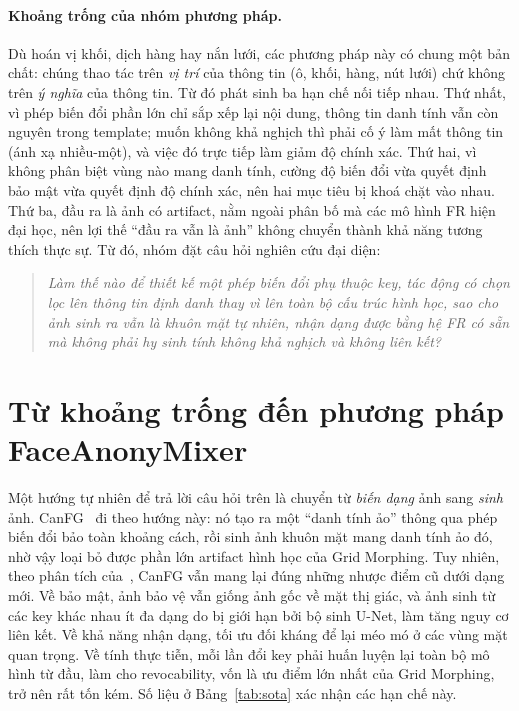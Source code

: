 \documentclass[12pt,a4paper]{article}
\begin{document}
\paragraph{Khoảng trống của nhóm phương pháp.} Dù hoán vị khối, dịch hàng hay nắn lưới, các phương pháp này có chung một bản chất: chúng thao tác trên \emph{vị trí} của thông tin (ô, khối, hàng, nút lưới) chứ không trên \emph{ý nghĩa} của thông tin. Từ đó phát sinh ba hạn chế nối tiếp nhau. Thứ nhất, vì phép biến đổi phần lớn chỉ sắp xếp lại nội dung, thông tin danh tính vẫn còn nguyên trong template; muốn không khả nghịch thì phải cố ý làm mất thông tin (ánh xạ nhiều-một), và việc đó trực tiếp làm giảm độ chính xác. Thứ hai, vì không phân biệt vùng nào mang danh tính, cường độ biến đổi vừa quyết định bảo mật vừa quyết định độ chính xác, nên hai mục tiêu bị khoá chặt vào nhau. Thứ ba, đầu ra là ảnh có artifact, nằm ngoài phân bố mà các mô hình FR hiện đại học, nên lợi thế ``đầu ra vẫn là ảnh'' không chuyển thành khả năng tương thích thực sự. Từ đó, nhóm đặt câu hỏi nghiên cứu đại diện:

\begin{quote}
\emph{Làm thế nào để thiết kế một phép biến đổi phụ thuộc key, tác động có chọn lọc lên thông tin định danh thay vì lên toàn bộ cấu trúc hình học, sao cho ảnh sinh ra vẫn là khuôn mặt tự nhiên, nhận dạng được bằng hệ FR có sẵn mà không phải hy sinh tính không khả nghịch và không liên kết?}
\end{quote}

\clearpage
\section{Từ khoảng trống đến phương pháp FaceAnonyMixer}
Một hướng tự nhiên để trả lời câu hỏi trên là chuyển từ \emph{biến dạng} ảnh sang \emph{sinh} ảnh. CanFG~\cite{wang2024canfg} đi theo hướng này: nó tạo ra một ``danh tính ảo'' thông qua phép biến đổi bảo toàn khoảng cách, rồi sinh ảnh khuôn mặt mang danh tính ảo đó, nhờ vậy loại bỏ được phần lớn artifact hình học của Grid Morphing. Tuy nhiên, theo phân tích của~\cite{alam2025}, CanFG vẫn mang lại đúng những nhược điểm cũ dưới dạng mới. Về bảo mật, ảnh bảo vệ vẫn giống ảnh gốc về mặt thị giác, và ảnh sinh từ các key khác nhau ít đa dạng do bị giới hạn bởi bộ sinh U-Net, làm tăng nguy cơ liên kết. Về khả năng nhận dạng, tối ưu đối kháng để lại méo mó ở các vùng mặt quan trọng. Về tính thực tiễn, mỗi lần đổi key phải huấn luyện lại toàn bộ mô hình từ đầu, làm cho revocability, vốn là ưu điểm lớn nhất của Grid Morphing, trở nên rất tốn kém. Số liệu ở Bảng~\ref{tab:sota} xác nhận các hạn chế này.
\end{document}
